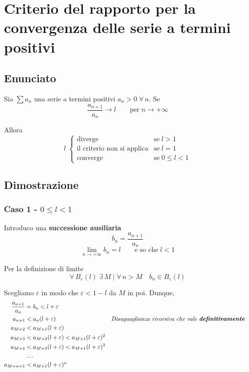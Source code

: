 \documentclass[../dimostrazioni]{subfiles}
\begin{document}
    \chapter{Criterio del rapporto per la convergenza delle serie a termini positivi}
    \label{criterioRapportoSerie}

        \section*{Enunciato}

            Sia \(\sum a_n\) una serie a termini positivi \(a_n > 0 \; \forall \, n\). Se
             \[\frac{a_{n+1}}{a_n} \longrightarrow l \qquad  \text{per} \; n \rightarrow +\infty \]
            
            Allora
            \[
                l \;
                \begin{cases}
                    \text{diverge} & \text{se} \; l > 1\\
                    \text{il criterio non si applica} & \text{se} \; l = 1\\
                    \text{converge} & \text{se} \; 0 \leqslant l < 1
                \end{cases}
            \]
            
        \section*{Dimostrazione}
            
            \subsection*{Caso 1 - \(0 \leqslant l < 1\)}

                Introduco una \textbf{successione ausiliaria}
                \[ b_n = \frac{a_{n+1}}{a_n} \]  
                \[\lim_{n \to +\infty} b_n = l \qquad \text{e so che} \; l < 1\]

                Per la definizione di limite
                \[\forall \, B_\varepsilon (l) \; \exists \, M \mid \forall \, n > M \quad b_n \in B_\varepsilon (l) \]

                Scegliamo \(\varepsilon\) in modo che \(\varepsilon < 1 - l\) da \(M\) in poi. Dunque,
                \begin{align*}
                    \frac{a_{n+1}}{a_n} &= b_n < l + \varepsilon \\
                    a_{n+1} &< a_n(l + \varepsilon) && \text{\emph{Disuguaglianza ricorsiva che vale \textbf{definitivamente}}} \\
                    a_{M+2} &< a_{M+1} (l + \varepsilon) \\
                    a_{M+3} &< a_{M+2} (l + \varepsilon) < a_{M+1}(l + \varepsilon)^{2}\\
                    a_{M+4} &< a_{M+3} (l + \varepsilon) < a_{M+1}(l + \varepsilon)^{3} \\
                    &\dots \\
                    a_{M+n+1} &< a_{M+1}(l + \varepsilon)^n
                \end{align*}
\end{document}
